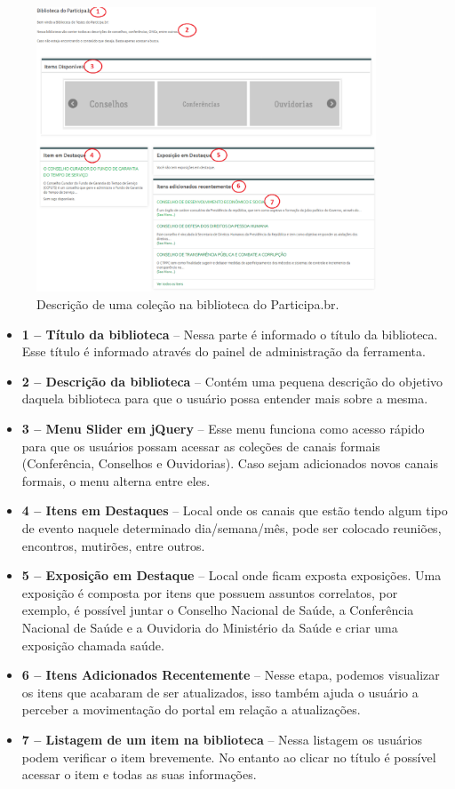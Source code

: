 \graphicspath{{figuras/prototipo/}}
\begin{figure}[H]
\centering
\includegraphics[width=0.9\textwidth]{pagina-inicial}
\caption{Descrição de uma coleção na biblioteca do Participa.br.}
\label{fig:inicial_prototipo}
\end{figure}

\begin{itemize}
	\item \textbf{1 – Título da biblioteca} – Nessa parte é informado o título da biblioteca. Esse título é informado através do painel de administração da ferramenta.
	\item \textbf{2 – Descrição da biblioteca} – Contém uma pequena descrição do objetivo daquela biblioteca para que o usuário possa entender mais sobre a mesma.
	\item \textbf{3 – Menu Slider em jQuery} – Esse menu funciona como acesso rápido para que os usuários possam acessar as coleções de canais formais (Conferência, Conselhos e Ouvidorias). Caso sejam adicionados novos canais formais, o menu alterna entre eles.
	\item \textbf{4 – Itens em Destaques} – Local onde os canais que estão tendo algum tipo de evento naquele determinado dia/semana/mês, pode ser colocado reuniões, encontros, mutirões, entre outros.
	\item \textbf{5 – Exposição em Destaque} – Local onde ficam exposta exposições. Uma exposição é composta por itens que possuem assuntos correlatos, por exemplo, é possível juntar o Conselho Nacional de Saúde, a Conferência Nacional de Saúde e a Ouvidoria do Ministério da Saúde e criar uma exposição chamada saúde.	
	\item \textbf{6 – Itens Adicionados Recentemente} – Nesse etapa, podemos visualizar os itens que acabaram de ser atualizados, isso também ajuda o usuário a perceber a movimentação do portal em relação a atualizações.
	\item \textbf{7 – Listagem de um item na biblioteca} – Nessa listagem os usuários podem verificar o item brevemente. No entanto ao clicar no título é possível acessar o item e todas as suas informações.
\end{itemize}

